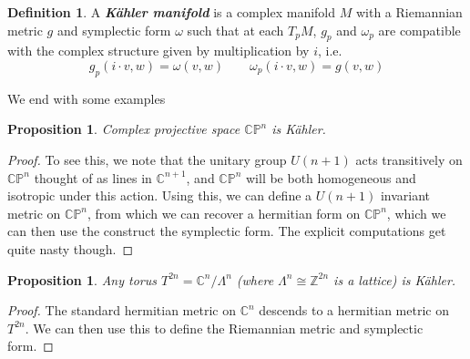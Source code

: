 \documentclass[psamsfonts]{amsart}
\newtheorem{prop}[thm]{Proposition}
\theoremstyle{definition}
\newtheorem{defn}[thm]{Definition}
\theoremstyle{remark}
\newcommand{\ib}[1]{\textbf{\textit{#1}}}
\newcommand{\Z}{\mathbb{Z}}
\newcommand{\C}{\mathbb{C}}
\newcommand{\CP}{\mathbb{CP}}
\begin{document}
%
\begin{defn}
A \ib{K\"ahler manifold} is a complex manifold $M$ with a Riemannian metric $g$ and symplectic form $\omega$ such that at each $T_pM$, $g_p$ and $\omega_p$ are compatible with the complex structure given by multiplication by $i$, i.e.
$$g_p(i\cdot v,w) = \omega(v,w) \qquad \omega_p(i\cdot v,w) = g(v,w) $$
\end{defn}
%
We end with some examples
\begin{prop}
Complex projective space $\CP^n$ is K\"ahler.
\end{prop}
%
\begin{proof}
To see this, we note that the unitary group $U(n+1)$ acts transitively on $\CP^n$ thought of as lines in $\C^{n+1}$, and $\CP^n$ will be both homogeneous and isotropic under this action. Using this, we can define a $U(n+1)$ invariant metric on $\CP^n$, from which we can recover a hermitian form on $\CP^n$, which we can then use the construct the symplectic form. The explicit computations get quite nasty though.
\end{proof}
%
\begin{prop}
Any torus $T^{2n} = \C^n / \Lambda^n$ (where $\Lambda^n \cong \Z^{2n}$ is a lattice) is K\"ahler.
\end{prop}
%
\begin{proof}
The standard hermitian metric on $\C^n$ descends to a hermitian metric on $T^{2n}$. We can then use this to define the Riemannian metric and symplectic form.
\end{proof}
%
\end{document}
